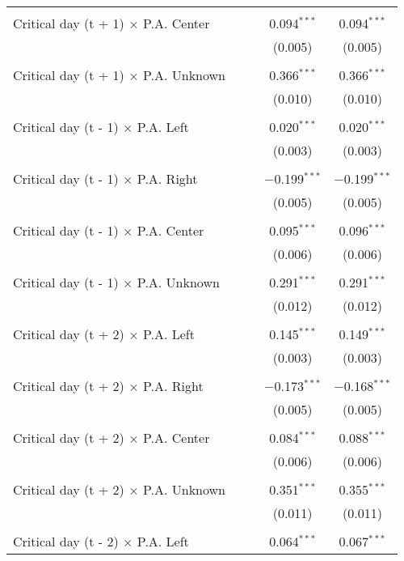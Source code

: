\documentclass[
]{article}
\begin{document}
\begin{table}[!htbp]
{\begin{tabular}{@{\extracolsep{5pt}}lcccc}
  & & & & \\ 
 Critical day (t + 1) $\times$ P.A. Center &  &  & 0.094$^{***}$ & 0.094$^{***}$ \\ 
  &  &  & (0.005) & (0.005) \\ 
  & & & & \\ 
 Critical day (t + 1) $\times$ P.A. Unknown &  &  & 0.366$^{***}$ & 0.366$^{***}$ \\ 
  &  &  & (0.010) & (0.010) \\ 
  & & & & \\ 
 Critical day (t - 1) $\times$ P.A. Left &  &  & 0.020$^{***}$ & 0.020$^{***}$ \\ 
  &  &  & (0.003) & (0.003) \\ 
  & & & & \\ 
 Critical day (t - 1) $\times$ P.A. Right &  &  & $-$0.199$^{***}$ & $-$0.199$^{***}$ \\ 
  &  &  & (0.005) & (0.005) \\ 
  & & & & \\ 
 Critical day (t - 1) $\times$ P.A. Center &  &  & 0.095$^{***}$ & 0.096$^{***}$ \\ 
  &  &  & (0.006) & (0.006) \\ 
  & & & & \\ 
 Critical day (t - 1) $\times$ P.A. Unknown &  &  & 0.291$^{***}$ & 0.291$^{***}$ \\ 
  &  &  & (0.012) & (0.012) \\ 
  & & & & \\ 
 Critical day (t + 2) $\times$ P.A. Left &  &  & 0.145$^{***}$ & 0.149$^{***}$ \\ 
  &  &  & (0.003) & (0.003) \\ 
  & & & & \\ 
 Critical day (t + 2) $\times$ P.A. Right &  &  & $-$0.173$^{***}$ & $-$0.168$^{***}$ \\ 
  &  &  & (0.005) & (0.005) \\ 
  & & & & \\ 
 Critical day (t + 2) $\times$ P.A. Center &  &  & 0.084$^{***}$ & 0.088$^{***}$ \\ 
  &  &  & (0.006) & (0.006) \\ 
  & & & & \\ 
 Critical day (t + 2) $\times$ P.A. Unknown &  &  & 0.351$^{***}$ & 0.355$^{***}$ \\ 
  &  &  & (0.011) & (0.011) \\ 
  & & & & \\ 
 Critical day (t - 2) $\times$ P.A. Left &  &  & 0.064$^{***}$ & 0.067$^{***}$ \\ 

\end{tabular}}
\end{table}
\end{document}
